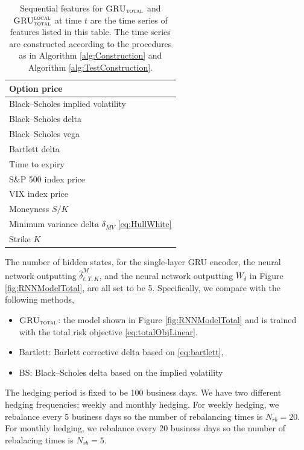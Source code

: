 \documentclass[letterpaper,12pt,titlepage,oneside,final]{book}
\numberwithin{equation}{section}
\theoremstyle{definition}
\newcommand{\modelT}{\textsc{GRU}_{\textsc{total}}}
\newcommand{\modelL}{\textsc{GRU}_{\textsc{total}}^{\textsc{local}}}
\begin{document}
\begin{table}[htp!]
	\centering
	\begin{tabular}{|l|}
		\hline
		Option  price\\ \hline
		Black–Scholes implied volatility\\
		\hline
		Black–Scholes delta\\
		\hline
		Black–Scholes vega \\
		\hline
		Bartlett delta \\
		\hline
		Time to expiry \\\hline
		S\&P 500 index price\\\hline
		VIX index price\\\hline
		Moneyness $S/K$\\\hline
		Minimum variance delta $\delta_{MV}$  \eqref{eq:HullWhite}\\\hline
		Strike $K$ \\   \hline
	\end{tabular}
	\caption{Sequential features for $\modelT$ and $\modelL$ at time $t$ are the  time series of features listed in this table. The time series are constructed according to the procedures as in Algorithm \ref{alg:Construction} and Algorithm \ref{alg:TestConstruction}.}
\end{table}

The number of hidden states, for the single-layer GRU encoder, the neural network outputting $\widehat{\delta}^M_{t,T,K}$, and the neural network outputting $W_{\delta}$  in Figure \ref{fig:RNNModelTotal}, are all set to be 5.  Specifically, we compare with the following methods,
\begin{itemize}
	\item $\modelT$: the model shown in Figure \ref{fig:RNNModelTotal} and is trained with the total risk objective \eqref{eq:totalObjLinear}.
	\item Bartlett: Barlett corrective  delta based on \eqref{eq:bartlett},
	\item BS: Black–Scholes delta based on the implied volatility 
\end{itemize}
The hedging period is fixed to be 100 business days. We have two different hedging frequencies: weekly and monthly hedging. For weekly hedging, we rebalance every 5 business days so the number of rebalancing times is $N_{rb}=20$. For monthly hedging, we rebalance every 20 business days so the number of rebalacing times is $N_{rb}=5$.
\end{document}
